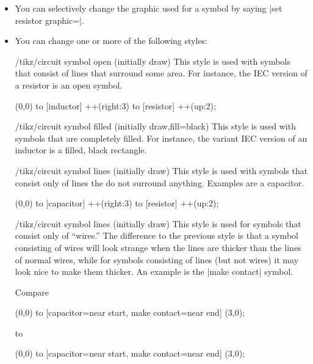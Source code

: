 \begin{itemize}
\begin{codeexample}[]
\end{codeexample}
\item You can selectively change the graphic used for a symbol
  by saying |set resistor graphic=|.
\item You can change one or more of the following styles:
  \begin{stylekey}{/tikz/circuit symbol open (initially draw)}
    This style is used with symbols that consist of lines that
    surround some area. For instance, the IEC version of a resistor is
    an open symbol. 
\begin{codeexample}[]
\tikz [circuit ee IEC,
       circuit symbol open/.style={thick,draw,fill=yellow}]
  \draw (0,0) to [inductor] ++(right:3) to [resistor] ++(up:2);
\end{codeexample}
  \end{stylekey}
  \begin{stylekey}{/tikz/circuit symbol filled (initially {draw,fill=black})}
    This style is used with symbols that are completely filled. For
    instance, the variant IEC version of an inductor is a filled,
    black rectangle. 
  \end{stylekey}
  \begin{stylekey}{/tikz/circuit symbol lines (initially draw)}
    This style is used with symbols that consist only of lines the do
    not surround anything. Examples are a capacitor.
\begin{codeexample}[]
\tikz [circuit ee IEC,
       circuit symbol lines/.style={thick,draw=red}]
  \draw (0,0) to [capacitor] ++(right:3) to [resistor] ++(up:2);
\end{codeexample}
  \end{stylekey}
  \begin{stylekey}{/tikz/circuit symbol lines (initially draw)}
    This style is used for symbols that consist only of ``wires.'' The
    difference to the previous style is that a symbol consisting of
    wires will look strange when the lines are thicker than the lines
    of normal wires, while for symbols consisting of lines (but not
    wires) it may look nice to make them thicker. An example is the
    |make contact| symbol.

    Compare 
\begin{codeexample}[]
\tikz [circuit ee IEC,circuit symbol lines/.style={draw,very thick}]
  \draw (0,0) to [capacitor={near start},
                  make contact={near end}] (3,0);
\end{codeexample}
    to 
\begin{codeexample}[]
\tikz [circuit ee IEC,circuit symbol wires/.style={draw,very thick}]
  \draw (0,0) to [capacitor={near start},
                  make contact={near end}] (3,0);
\end{codeexample}
  \end{stylekey}
\end{itemize}

